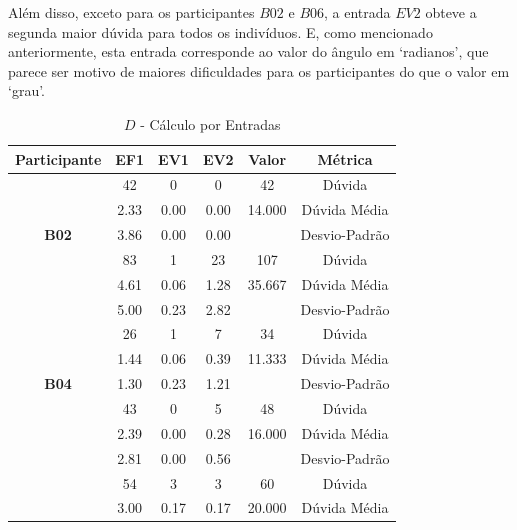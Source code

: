 Além disso, exceto para os participantes $B02$ e $B06$, a entrada $EV2$ obteve a segunda maior dúvida para todos os indivíduos. E, como mencionado anteriormente, esta entrada corresponde ao valor do ângulo em `radianos', que parece ser motivo de maiores dificuldades para os participantes do que o valor em `grau'.

\begin{table}[htbp]
	\centering
	\caption{$D$ - Cálculo por Entradas}
	\begin{tabular}{|c|c|c|c|c|c|}
		\hline
		\rowcolor[HTML]{D0CECE} 
		\textbf{Participante} & \textbf{EF1} & \textbf{EV1} & \textbf{EV2} & \textbf{Valor} & \textbf{Métrica} \\ \hline
		\cellcolor[HTML]{F2F2F2} & 42 & 0 & 0 & 42 & Dúvida \\ \cline{2-6} 
		\rowcolor[HTML]{D9D9D9} 
		\cellcolor[HTML]{F2F2F2} & 2.33 & 0.00 & 0.00 & 14.000 & Dúvida Média \\ \cline{2-6} 
		\multirow{-3}{*}{\cellcolor[HTML]{F2F2F2}\textbf{B02}} & 3.86 & 0.00 & 0.00 &  & Desvio-Padrão \\ \hline
		\rowcolor[HTML]{D9D9D9} 
		\cellcolor[HTML]{F2F2F2} & 83 & 1 & 23 & 107 & Dúvida \\ \cline{2-6} 
		\cellcolor[HTML]{F2F2F2} & 4.61 & 0.06 & 1.28 & 35.667 & Dúvida Média \\ \cline{2-6} 
		\rowcolor[HTML]{D9D9D9} 
		\multirow{-3}{*}{\cellcolor[HTML]{F2F2F2}\textbf{B03}} & 5.00 & 0.23 & 2.82 &  & Desvio-Padrão \\ \hline
		\cellcolor[HTML]{F2F2F2} & 26 & 1 & 7 & 34 & Dúvida \\ \cline{2-6} 
		\rowcolor[HTML]{D9D9D9} 
		\cellcolor[HTML]{F2F2F2} & 1.44 & 0.06 & 0.39 & 11.333 & Dúvida Média \\ \cline{2-6} 
		\multirow{-3}{*}{\cellcolor[HTML]{F2F2F2}\textbf{B04}} & 1.30 & 0.23 & 1.21 &  & Desvio-Padrão \\ \hline
		\rowcolor[HTML]{D9D9D9} 
		\cellcolor[HTML]{F2F2F2} & 43 & 0 & 5 & 48 & Dúvida \\ \cline{2-6} 
		\cellcolor[HTML]{F2F2F2} & 2.39 & 0.00 & 0.28 & 16.000 & Dúvida Média \\ \cline{2-6} 
		\rowcolor[HTML]{D9D9D9} 
		\multirow{-3}{*}{\cellcolor[HTML]{F2F2F2}\textbf{B05}} & 2.81 & 0.00 & 0.56 &  & Desvio-Padrão \\ \hline
		\cellcolor[HTML]{F2F2F2} & 54 & 3 & 3 & 60 & Dúvida \\ \cline{2-6} 
		\rowcolor[HTML]{D9D9D9} 
		\cellcolor[HTML]{F2F2F2} & 3.00 & 0.17 & 0.17 & 20.000 & Dúvida Média \\ \cline{2-6} 

\end{tabular}
\end{table}
